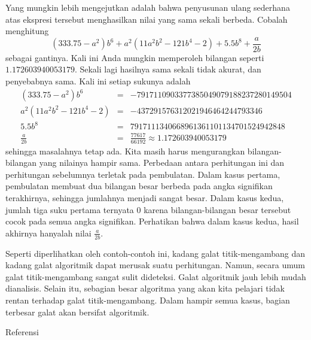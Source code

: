 Yang mungkin lebih mengejutkan adalah bahwa penyusunan ulang sederhana
atas ekspresi tersebut menghasilkan nilai yang sama sekali berbeda.
Cobalah menghitung 
\[
(333.75-a^{2})b^{6}+a^{2}(11a^{2}b^{2}-121b^{4}-2)+5.5b^{8}+\frac{a}{2b}
\]
sebagai gantinya. Kali ini Anda mungkin memperoleh bilangan seperti
$1.172603940053179$. Sekali lagi hasilnya sama sekali tidak akurat,
dan penyebabnya sama. Kali ini setiap sukunya adalah
\begin{eqnarray*}
(333.75-a^{2})b^{6} & = & -7917110903377385049079188237280149504\\
a^{2}(11a^{2}b^{2}-121b^{4}-2) & = & -437291576312021946464244793346\\
5.5b^{8} & = & 7917111340668961361101134701524942848\\
\frac{a}{2b} & = & \frac{77617}{66192}\approx1.172603940053179
\end{eqnarray*}
sehingga masalahnya tetap ada. Kita masih harus mengurangkan bilangan-bilangan
yang nilainya hampir sama. Perbedaan antara perhitungan ini dan perhitungan
sebelumnya terletak pada pembulatan. Dalam kasus pertama, pembulatan
membuat dua bilangan besar berbeda pada angka signifikan terakhirnya,
sehingga jumlahnya menjadi sangat besar. Dalam kasus kedua, jumlah
tiga suku pertama ternyata $0$ karena bilangan-bilangan besar tersebut
cocok pada semua angka signifikan. Perhatikan bahwa dalam kasus kedua,
hasil akhirnya hanyalah nilai $\frac{a}{2b}$.

Seperti diperlihatkan oleh contoh-contoh ini, kadang galat titik-mengambang
dan kadang galat algoritmik dapat merusak suatu perhitungan. Namun,
secara umum galat titik-mengambang sangat sulit dideteksi. Galat algoritmik
jauh lebih mudah dianalisis. Selain itu, sebagian besar algoritma
yang akan kita pelajari tidak rentan terhadap galat titik-mengambang.
Dalam hampir semua kasus, bagian terbesar galat akan bersifat algoritmik.
\begin{description}
\item [{Referensi}] \cite{rump,loh}
\end{description}

